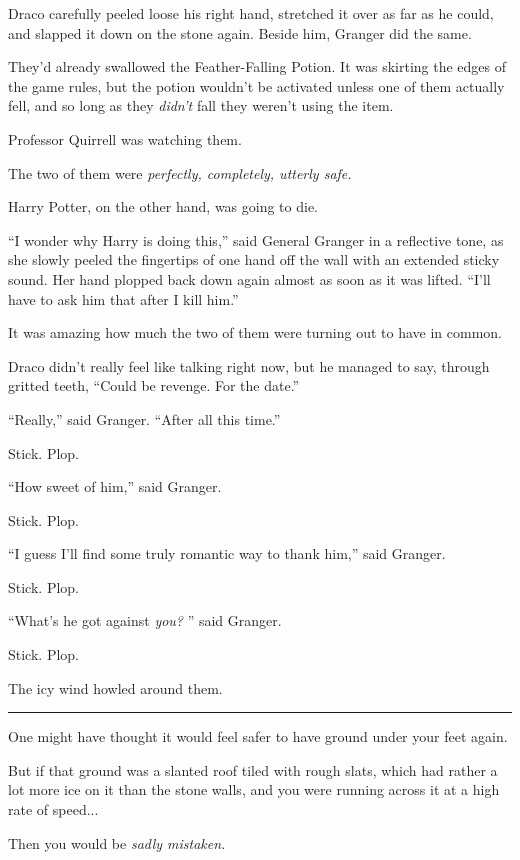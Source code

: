 Draco carefully peeled loose his right hand, stretched it over as far as
he could, and slapped it down on the stone again. Beside him, Granger
did the same.

They'd already swallowed the Feather-Falling Potion. It was skirting the
edges of the game rules, but the potion wouldn't be activated unless one
of them actually fell, and so long as they \emph{didn't} fall they
weren't using the item.

Professor Quirrell was watching them.

The two of them were \emph{perfectly, completely, utterly safe.}

Harry Potter, on the other hand, was going to die.

``I wonder why Harry is doing this,'' said General Granger in a
reflective tone, as she slowly peeled the fingertips of one hand off the
wall with an extended sticky sound. Her hand plopped back down again
almost as soon as it was lifted. ``I'll have to ask him that after I
kill him.''

It was amazing how much the two of them were turning out to have in
common.

Draco didn't really feel like talking right now, but he managed to say,
through gritted teeth, ``Could be revenge. For the date.''

``Really,'' said Granger. ``After all this time.''

Stick. Plop.

``How sweet of him,'' said Granger.

Stick. Plop.

``I guess I'll find some truly romantic way to thank him,'' said
Granger.

Stick. Plop.

``What's he got against \emph{you?} '' said Granger.

Stick. Plop.

The icy wind howled around them.

\begin{center}\rule{3in}{0.4pt}\end{center}

One might have thought it would feel safer to have ground under your
feet again.

But if that ground was a slanted roof tiled with rough slats, which had
rather a lot more ice on it than the stone walls, and you were running
across it at a high rate of speed...

Then you would be \emph{sadly mistaken.}

